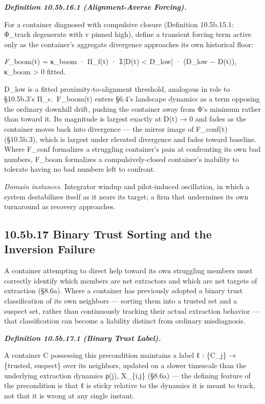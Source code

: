 \documentclass[
]{article}
\begin{document}
\emph{\textbf{Definition 10.5b.16.1 (Alignment-Averse Forcing).}}

For a container diagnosed with compulsive closure (Definition
10.5b.15.1: Φ\_track degenerate with v pinned high), define a transient
forcing term active only as the container's aggregate divergence
approaches its own historical floor:

\emph{F}\_boom(t) = κ\_boom · Π\_f(t) · 𝟙{[}D(t) \textless{} D\_low{]} ·
(D\_low − D(t)), κ\_boom \textgreater{} 0 fitted.

D\_low is a fitted proximity-to-alignment threshold, analogous in role
to §10.5b.3's Π\_c.~F\_boom(t) enters §6.4's landscape dynamics as a
term opposing the ordinary downhill drift, pushing the container away
from Φ's minimum rather than toward it. Its magnitude is largest exactly
at D(t) → 0 and fades as the container moves back into divergence ---
the mirror image of F\_conf(t) (§10.5b.3), which is largest under
elevated divergence and fades toward baseline. Where F\_conf formalizes
a struggling container's pain at confronting its own bad numbers,
F\_boom formalizes a compulsively-closed container's inability to
tolerate having no bad numbers left to confront.

\emph{Domain instances.} Integrator windup and pilot-induced
oscillation, in which a system destabilizes itself as it nears its
target; a firm that undermines its own turnaround as recovery
approaches.

\hypertarget{b.17-binary-trust-sorting-and-the-inversion-failure}{%
\subsection{10.5b.17 Binary Trust Sorting and the Inversion
Failure}\label{b.17-binary-trust-sorting-and-the-inversion-failure}}

A container attempting to direct help toward its own struggling members
must correctly identify which members are net extractors and which are
net targets of extraction (§8.6a). Where a container has previously
adopted a binary trust classification of its own neighbors --- sorting
them into a trusted set and a suspect set, rather than continuously
tracking their actual extraction behavior --- that classification can
become a liability distinct from ordinary misdiagnosis.

\emph{\textbf{Definition 10.5b.17.1 (Binary Trust Label).}}

A container C possessing this precondition maintains a label ℓ :
\{C\_j\} → \{trusted, suspect\} over its neighbors, updated on a slower
timescale than the underlying extraction dynamics ρ(j), X\_\{i,j\}
(§8.6a) --- the defining feature of the precondition is that ℓ is sticky
relative to the dynamics it is meant to track, not that it is wrong at
any single instant.
\end{document}
